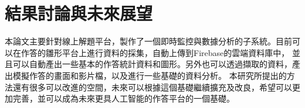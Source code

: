 \chapter{結果討論與未來展望}
本論文主要針對線上解題平台，製作了一個即時監控與數據分析的子系統。目前可以在作答的雛形平台上進行資料的採集，自動上傳到Firebase的雲端資料庫中，
並且可以自動產出一些基本的作答統計資料和圖形。另外也可以透過擷取的資料，產出模擬作答的畫面和影片檔，以及進行一些基礎的資料分析。
本研究所提出的方法還有很多可以改進的空間，未來可以根據這個基礎繼續擴充及改良，希望可以更加完善，並可以成為未來更具人工智能的作答平台的一個基礎。

